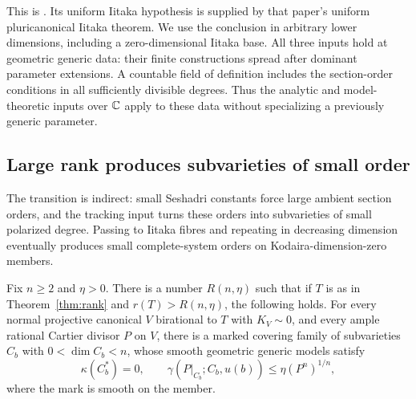 This is \cite[Lemma~6.4]{UPI}.  Its uniform Iitaka hypothesis is supplied by that paper's
uniform pluricanonical Iitaka theorem.  We use the conclusion in
arbitrary lower dimensions, including a zero-dimensional Iitaka base.
All three inputs hold at geometric generic data: their finite
constructions spread after dominant parameter extensions.  A countable
field of definition includes the section-order conditions in all
sufficiently divisible degrees.  Thus the analytic and model-theoretic
inputs over $\mathbb C$ apply to these data without specializing a previously
generic parameter.

\subsection{Large rank produces subvarieties of small order}

The transition is indirect: small Seshadri constants force large
ambient section orders, and the tracking input turns these orders into
subvarieties of small polarized degree.  Passing to Iitaka fibres and repeating in
decreasing dimension eventually produces small complete-system orders
on Kodaira-dimension-zero members.

\begin{lemma}\label{lem:rank:low-order}
Fix $n\ge2$ and $\eta>0$.  There is a number $R(n,\eta)$ such that if
$T$ is as in Theorem~\ref{thm:rank} and $r(T)>R(n,\eta)$, the following
holds.  For every normal projective canonical $V$ birational to $T$
with $K_V\sim0$, and every ample rational Cartier divisor $P$ on $V$,
there is a marked covering family of subvarieties $C_b$ with
$0<\dim C_b<n$, whose smooth geometric generic models satisfy
\begin{equation}\label{eq:rank:low-order}
 \kappa(C_b^*)=0,
 \qquad
 \gamma(P|_{C_b};C_b,u(b))\le\eta(P^n)^{1/n},
\end{equation}
where the mark is smooth on the member.
\end{lemma}

